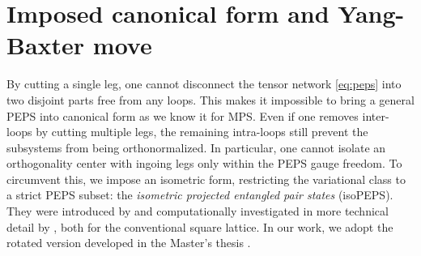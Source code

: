 \section{Imposed canonical form and Yang-Baxter move} \label{sec:canonical_form_yb}
By cutting a single leg, one cannot disconnect the tensor network \eqref{eq:peps} into two disjoint parts free from any loops. This makes it impossible to bring a general PEPS into canonical form as we know it for MPS. Even if one removes inter-loops by cutting multiple legs, the remaining intra-loops still prevent the subsystems from being orthonormalized. In particular, one cannot isolate an orthogonality center with ingoing legs only within the PEPS gauge freedom. To circumvent this, we impose an isometric form, restricting the variational class to a strict PEPS subset: the \textit{isometric projected entangled pair states} (isoPEPS). They were introduced by \cite{zaletel2020isometric} and computationally investigated in more technical detail by \cite{lin2022efficient}, both for the conventional square lattice. In our work, we adopt the rotated version developed in the Master's thesis \cite{sappler2024diagonal, sappler2025diagonal}. \\[0.5em]

